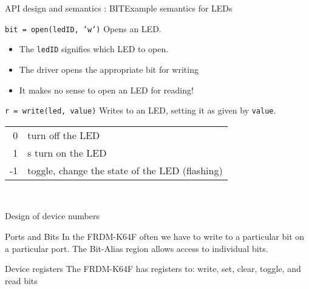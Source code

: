 \documentclass[xcolor=svgnames]{beamer}
\begin{document}
\begin{frame}[fragile]{API design and semantics : BIT}{Example semantics for LEDs}
\begin{block}{\texttt{bit = open(ledID, 'w')}}
Opens an LED.
\end{block}
\begin{itemize}
    \item The \alert{\texttt{ledID}} signifies which LED to open.
    \item The driver opens the appropriate bit for writing
    \item It makes no sense to open an LED for reading!
\end{itemize}
\begin{block}{\texttt{r = write(led, value)}}
Writes to an LED, setting it as given by \alert{\texttt{value}}.
\begin{tabular}{rl}
     0  & turn off the LED \\
    1  &s turn on the LED \\
     -1 & toggle, change the state of the LED  (flashing)
\end{tabular}\\
\end{block}
\end{frame}

\begin{frame}{Design of device numbers}
\begin{exampleblock}{Ports and Bits}
    In the FRDM-K64F often we have to write to a particular bit on a particular port.
    The \alert{Bit-Alias} region allows access to individual bits.
\end{exampleblock}
\begin{block}{Device registers}
    The FRDM-K64F has registers to: write, set, clear, toggle, and read bits
\end{block}
\end{frame}
\end{document}
